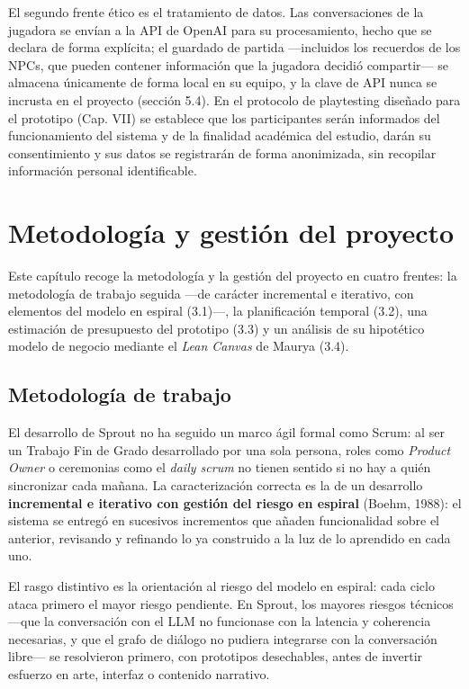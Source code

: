 \documentclass[12pt,twoside,titlepage]{report}
\begin{document}
El segundo frente ético es el tratamiento de datos. Las conversaciones de la jugadora se envían a la API de OpenAI para su procesamiento, hecho que se declara de forma explícita; el guardado de partida ---incluidos los recuerdos de los NPCs, que pueden contener información que la jugadora decidió compartir--- se almacena únicamente de forma local en su equipo, y la clave de API nunca se incrusta en el proyecto (sección 5.4). En el protocolo de playtesting diseñado para el prototipo (Cap. VII) se establece que los participantes serán informados del funcionamiento del sistema y de la finalidad académica del estudio, darán su consentimiento y sus datos se registrarán de forma anonimizada, sin recopilar información personal identificable.



\chapter{Metodología y gestión del proyecto}

Este capítulo recoge la metodología y la gestión del proyecto en cuatro frentes: la metodología de trabajo seguida ---de carácter incremental e iterativo, con elementos del modelo en espiral (3.1)---, la planificación temporal (3.2), una estimación de presupuesto del prototipo (3.3) y un análisis de su hipotético modelo de negocio mediante el \textit{Lean Canvas} de Maurya (3.4).

\section{Metodología de trabajo}

El desarrollo de Sprout no ha seguido un marco ágil formal como Scrum: al ser un Trabajo Fin de Grado desarrollado por una sola persona, roles como \textit{Product Owner} o ceremonias como el \textit{daily scrum} no tienen sentido si no hay a quién sincronizar cada mañana. La caracterización correcta es la de un desarrollo \textbf{incremental e iterativo con gestión del riesgo en espiral} (Boehm, 1988): el sistema se entregó en sucesivos incrementos que añaden funcionalidad sobre el anterior, revisando y refinando lo ya construido a la luz de lo aprendido en cada uno.

El rasgo distintivo es la orientación al riesgo del modelo en espiral: cada ciclo ataca primero el mayor riesgo pendiente. En Sprout, los mayores riesgos técnicos ---que la conversación con el LLM no funcionase con la latencia y coherencia necesarias, y que el grafo de diálogo no pudiera integrarse con la conversación libre--- se resolvieron primero, con prototipos desechables, antes de invertir esfuerzo en arte, interfaz o contenido narrativo.
\end{document}

